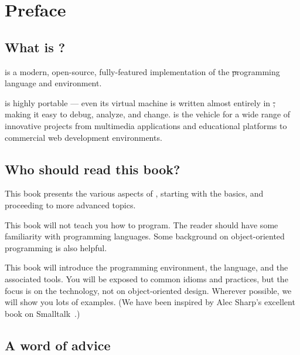 \documentclass[a4paper,10pt,twoside]{book}
\begin{document}
	\renewcommand{\nnbb}[2]{} %
	\frontmatter
\fi
\chapter{Preface}\label{cha:intro}

\section*{What is \sq?}

\sq is a modern, open-source, fully-featured implementation of the \st programming language and environment.

\sq is highly portable --- even its virtual machine is written almost entirely in \st, making it easy to debug, analyze, and change.
\sq is the vehicle for a wide range of innovative projects from multimedia applications and educational platforms to commercial web development environments.

\section*{Who should read this book?}

This book presents the various aspects of \sq, starting with the basics, and proceeding to more advanced topics.

This book will not teach you how to program.
The reader should have some familiarity with programming languages.
Some background on object-oriented programming is also helpful.

This book will introduce the \sq programming environment, the language, and the associated tools.
You will be exposed to common idioms and practices, but the focus is on the technology, not on object-oriented design.
Wherever possible, we will show you lots of examples.
(We have been inspired by Alec Sharp's excellent book on Smalltalk~\cite{Shar97a}.)

\ifluluelse{}{\newpage} %
\section*{A word of advice}

\end{document}
